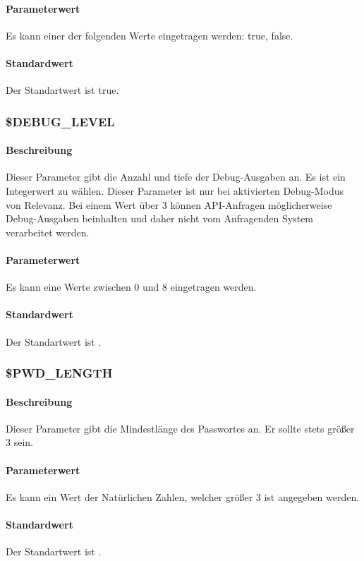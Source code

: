 \paragraph{Parameterwert}Es kann einer der folgenden Werte eingetragen werden: {\glqq true\grqq}, {\glqq false\grqq}.
\paragraph{Standardwert}Der Standartwert ist {\glqq true\grqq}.

\subsubsection{\$DEBUG\_LEVEL}\label{config:debug-level}
\paragraph{Beschreibung}Dieser Parameter gibt die Anzahl und tiefe der Debug-Ausgaben an. Es ist ein Integerwert zu wählen. Dieser Parameter ist nur bei aktivierten Debug-Modus von Relevanz. Bei einem Wert über 3 können API-Anfragen möglicherweise Debug-Ausgaben beinhalten und daher nicht vom Anfragenden System verarbeitet werden.
\paragraph{Parameterwert}Es kann eine Werte zwischen 0 und 8 eingetragen werden.
\paragraph{Standardwert}Der Standartwert ist {\grqq}.

\subsubsection{\$PWD\_LENGTH}
\paragraph{Beschreibung}Dieser Parameter gibt die Mindestlänge des Passwortes an. Er sollte stets größer 3 sein.
\paragraph{Parameterwert}Es kann ein Wert der Natürlichen Zahlen, welcher größer 3 ist angegeben werden.
\paragraph{Standardwert}Der Standartwert ist {\grqq}.

